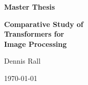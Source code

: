 \thispagestyle{empty}

\begin{center}
	\Large
    \bfseries
	Master Thesis
\end{center}


\vspace{0.5cm}
\begin{center}
	\Huge
	\bfseries
	Comparative Study of\\
	\vspace{0.25cm}
	Transformers for\\
	\vspace{0.25cm}
	Image Processing \\
\end{center}

\vspace{1cm}
\begin{center}
{\Large Dennis Rall}
\end{center}

\vspace{0.1cm}
\begin{center}
    \Large
	\today
\end{center}

